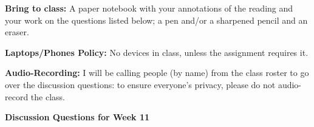 \documentclass[12pt,dvipsnames]{article}
\newcommand*\circled[1]{\tikz[baseline=(char.base)]{%
		\node[shape=circle,fill=blue!20,draw,inner sep=2pt] (char) {#1};}}
\begin{document}
		
{\bfseries{Bring to class:} } A paper notebook with your annotations of the reading and your work on the questions listed below; a pen and/or a sharpened pencil and an eraser.

{\bfseries{Laptops/Phones Policy:}}  No devices in class, unless the assignment requires it.

{\bfseries{Audio-Recording:}} I will be calling people (by name) from the class roster to go over the discussion questions: to ensure everyone's privacy, please do not audio-record the class.


\begin{center}

{\large{\bfseries{Discussion Questions for Week 11} }}
\end{center}
		\renewcommand{\labelenumi}{(\arabic{enumi})}
\end{document}
